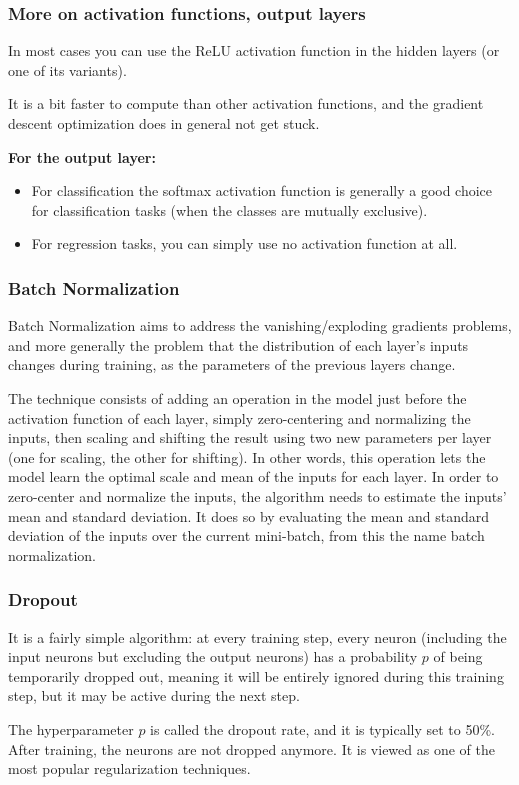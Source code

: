 \documentclass{beamer}
\begin{document}
\begin{frame}
\frametitle{More on activation functions, output layers}

In most cases you can use the ReLU activation function in the hidden
layers (or one of its variants).

It is a bit faster to compute than other activation functions, and the
gradient descent optimization does in general not get stuck.

\textbf{For the output layer:}

\begin{itemize}
\item For classification the softmax activation function is generally a good choice for classification tasks (when the classes are mutually exclusive).

\item For regression tasks, you can simply use no activation function at all.
\end{itemize}

\noindent
\end{frame}

\begin{frame}
\frametitle{Batch Normalization}

Batch Normalization aims to address the vanishing/exploding gradients
problems, and more generally the problem that the distribution of each
layer’s inputs changes during training, as the parameters of the
previous layers change.

The technique consists of adding an operation in the model just before
the activation function of each layer, simply zero-centering and
normalizing the inputs, then scaling and shifting the result using two
new parameters per layer (one for scaling, the other for shifting). In
other words, this operation lets the model learn the optimal scale and
mean of the inputs for each layer.  In order to zero-center and
normalize the inputs, the algorithm needs to estimate the inputs’ mean
and standard deviation. It does so by evaluating the mean and standard
deviation of the inputs over the current mini-batch, from this the
name batch normalization.
\end{frame}

\begin{frame}
\frametitle{Dropout}

It is a fairly simple algorithm: at every training step, every neuron
(including the input neurons but excluding the output neurons) has a
probability $p$ of being temporarily dropped out, meaning it will be
entirely ignored during this training step, but it may be active
during the next step.

The hyperparameter $p$ is called the dropout rate, and it is typically
set to 50\%. After training, the neurons are not dropped anymore.  It
is viewed as one of the most popular regularization techniques.
\end{frame}
\end{document}
